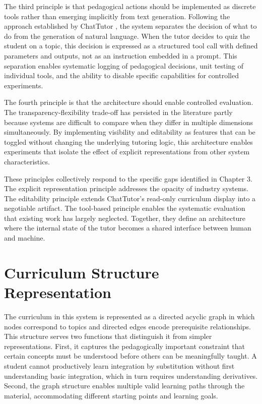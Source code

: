 \documentclass[logo,bsc,singlespacing,parskip,online]{infthesis}
\begin{document}
The third principle is that pedagogical actions should be implemented as discrete tools rather than emerging implicitly from text generation. Following the approach established by ChatTutor \citep{chen2024chattutor}, the system separates the decision of what to do from the generation of natural language. When the tutor decides to quiz the student on a topic, this decision is expressed as a structured tool call with defined parameters and outputs, not as an instruction embedded in a prompt. This separation enables systematic logging of pedagogical decisions, unit testing of individual tools, and the ability to disable specific capabilities for controlled experiments.

The fourth principle is that the architecture should enable controlled evaluation. The transparency-flexibility trade-off has persisted in the literature partly because systems are difficult to compare when they differ in multiple dimensions simultaneously. By implementing visibility and editability as features that can be toggled without changing the underlying tutoring logic, this architecture enables experiments that isolate the effect of explicit representations from other system characteristics.

These principles collectively respond to the specific gaps identified in Chapter 3. The explicit representation principle addresses the opacity of industry systems. The editability principle extends ChatTutor's read-only curriculum display into a negotiable artifact. The tool-based principle enables the systematic evaluation that existing work has largely neglected. Together, they define an architecture where the internal state of the tutor becomes a shared interface between human and machine.

\section{Curriculum Structure Representation}

The curriculum in this system is represented as a directed acyclic graph in which nodes correspond to topics and directed edges encode prerequisite relationships. This structure serves two functions that distinguish it from simpler representations. First, it captures the pedagogically important constraint that certain concepts must be understood before others can be meaningfully taught. A student cannot productively learn integration by substitution without first understanding basic integration, which in turn requires understanding derivatives. Second, the graph structure enables multiple valid learning paths through the material, accommodating different starting points and learning goals.
\end{document}
